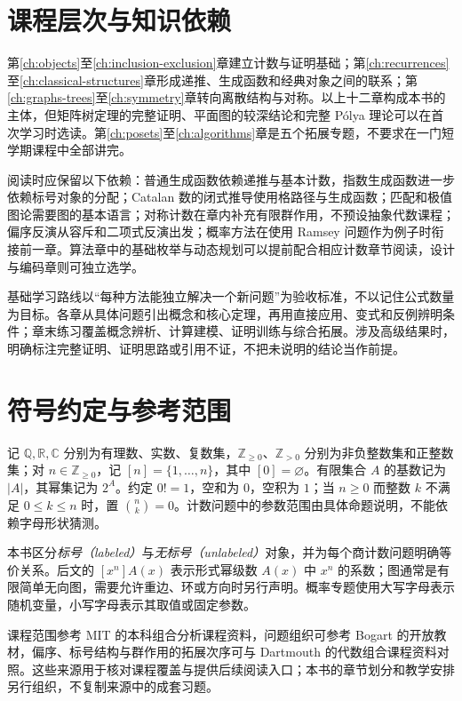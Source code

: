 \section{课程层次与知识依赖}

第\ref{ch:objects}至\ref{ch:inclusion-exclusion}章建立计数与证明基础；第\ref{ch:recurrences}至\ref{ch:classical-structures}章形成递推、生成函数和经典对象之间的联系；第\ref{ch:graphs-trees}至\ref{ch:symmetry}章转向离散结构与对称。以上十二章构成本书的主体，但矩阵树定理的完整证明、平面图的较深结论和完整 P\'olya 理论可以在首次学习时选读。第\ref{ch:posets}至\ref{ch:algorithms}章是五个拓展专题，不要求在一门短学期课程中全部讲完。

阅读时应保留以下依赖：普通生成函数依赖递推与基本计数，指数生成函数进一步依赖标号对象的分配；Catalan 数的闭式推导使用格路径与生成函数；匹配和极值图论需要图的基本语言；对称计数在章内补充有限群作用，不预设抽象代数课程；偏序反演从容斥和二项式反演出发；概率方法在使用 Ramsey 问题作为例子时衔接前一章。算法章中的基础枚举与动态规划可以提前配合相应计数章节阅读，设计与编码章则可独立选学。

基础学习路线以“每种方法能独立解决一个新问题”为验收标准，不以记住公式数量为目标。各章从具体问题引出概念和核心定理，再用直接应用、变式和反例辨明条件；章末练习覆盖概念辨析、计算建模、证明训练与综合拓展。涉及高级结果时，明确标注完整证明、证明思路或引用不证，不把未说明的结论当作前提。

\section{符号约定与参考范围}

记 $\mathbb Q,\mathbb R,\mathbb C$ 分别为有理数、实数、复数集，$\mathbb Z_{\ge0}$、$\mathbb Z_{>0}$ 分别为非负整数集和正整数集；对 $n\in\mathbb Z_{\ge0}$，记 $[n]=\{1,\ldots,n\}$，其中 $[0]=\varnothing$。有限集合 $A$ 的基数记为 $|A|$，其幂集记为 $2^A$。约定 $0!=1$，空和为 $0$，空积为 $1$；当 $n\ge0$ 而整数 $k$ 不满足 $0\le k\le n$ 时，置 $\binom nk=0$。计数问题中的参数范围由具体命题说明，不能依赖字母形状猜测。

本书区分\emph{标号（labeled）}与\emph{无标号（unlabeled）}对象，并为每个商计数问题明确等价关系。后文的 $[x^n]A(x)$ 表示形式幂级数 $A(x)$ 中 $x^n$ 的系数；图通常是有限简单无向图，需要允许重边、环或方向时另行声明。概率专题使用大写字母表示随机变量，小写字母表示其取值或固定参数。

课程范围参考 MIT 的本科组合分析课程资料\cite{mit-combinatorics}，问题组织可参考 Bogart 的开放教材\cite{bogart}，偏序、标号结构与群作用的拓展次序可与 Dartmouth 的代数组合课程资料\cite{dartmouth-combinatorics}对照。这些来源用于核对课程覆盖与提供后续阅读入口；本书的章节划分和教学安排另行组织，不复制来源中的成套习题。

